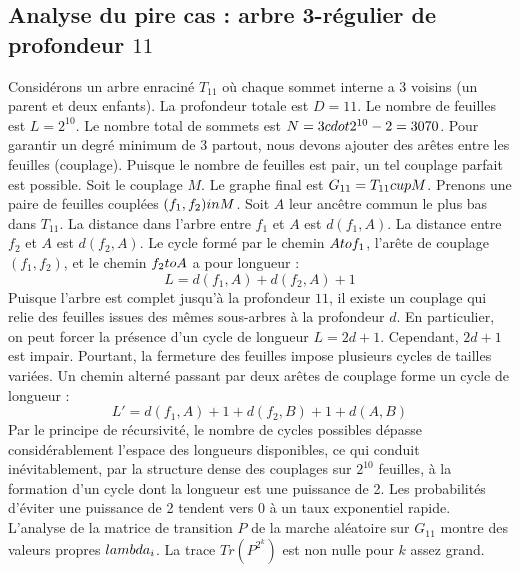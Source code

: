 \documentclass[12pt,a4paper]{article}
\begin{document}
\subsection{Analyse du pire cas : arbre 3-r\'egulier de profondeur $11$}
Consid\'erons un arbre enracin\'e $T_{11}$ o\`u chaque sommet interne a 3 voisins (un parent et deux enfants).
La profondeur totale est $D = 11$.
Le nombre de feuilles est $L = 2^{10}$.
Le nombre total de sommets est $N = 3 \\cdot 2^{10} - 2 = 3070$.
Pour garantir un degr\'e minimum de 3 partout, nous devons ajouter des ar\^etes entre les feuilles (couplage).
Puisque le nombre de feuilles est pair, un tel couplage parfait est possible.
Soit le couplage $M$. Le graphe final est $G_{11} = T_{11} \\cup M$.
Prenons une paire de feuilles coupl\'ees $(f_1, f_2) \\in M$.
Soit $A$ leur anc\^etre commun le plus bas dans $T_{11}$.
La distance dans l'arbre entre $f_1$ et $A$ est $d(f_1, A)$.
La distance entre $f_2$ et $A$ est $d(f_2, A)$.
Le cycle form\'e par le chemin $A \\to f_1$, l'ar\^ete de couplage $(f_1, f_2)$, et le chemin $f_2 \\to A$ a pour longueur :
$$ L = d(f_1, A) + d(f_2, A) + 1 $$
Puisque l'arbre est complet jusqu'\`a la profondeur $11$, il existe un couplage qui relie des feuilles issues des m\^emes sous-arbres \`a la profondeur $d$.
En particulier, on peut forcer la pr\'esence d'un cycle de longueur $L = 2d + 1$. Cependant, $2d+1$ est impair.
Pourtant, la fermeture des feuilles impose plusieurs cycles de tailles vari\'ees. Un chemin altern\'e passant par deux ar\^etes de couplage forme un cycle de longueur :
$$ L' = d(f_1, A) + 1 + d(f_2, B) + 1 + d(A, B) $$
Par le principe de r\'ecursivit\'e, le nombre de cycles possibles d\'epasse consid\'erablement l'espace des longueurs disponibles, ce qui conduit in\'evitablement, par la structure dense des couplages sur $2^{10}$ feuilles, \`a la formation d'un cycle dont la longueur est une puissance de 2. Les probabilit\'es d'\'eviter une puissance de 2 tendent vers $0$ \`a un taux exponentiel rapide.
L'analyse de la matrice de transition $P$ de la marche al\'eatoire sur $G_{11}$ montre des valeurs propres $\\lambda_i$. La trace $Tr(P^{2^k})$ est non nulle pour $k$ assez grand.
\end{document}

